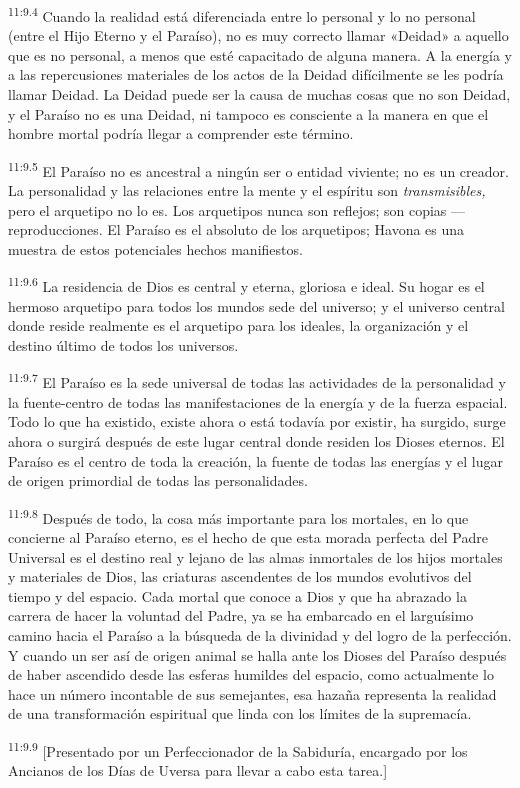 \par
\textsuperscript{11:9.4} Cuando la realidad está diferenciada entre lo personal y lo no personal (entre el Hijo Eterno y el Paraíso), no es muy correcto llamar «Deidad» a aquello que es no personal, a menos que esté capacitado de alguna manera. A la energía y a las repercusiones materiales de los actos de la Deidad difícilmente se les podría llamar Deidad. La Deidad puede ser la causa de muchas cosas que no son Deidad, y el Paraíso no es una Deidad, ni tampoco es consciente a la manera en que el hombre mortal podría llegar a comprender este término.

\par
\textsuperscript{11:9.5} El Paraíso no es ancestral a ningún ser o entidad viviente; no es un creador. La personalidad y las relaciones entre la mente y el espíritu son \textit{transmisibles,} pero el arquetipo no lo es. Los arquetipos nunca son reflejos; son copias ---reproducciones. El Paraíso es el absoluto de los arquetipos; Havona es una muestra de estos potenciales hechos manifiestos.

\par
\textsuperscript{11:9.6} La residencia de Dios es central y eterna, gloriosa e ideal. Su hogar es el hermoso arquetipo para todos los mundos sede del universo; y el universo central donde reside realmente es el arquetipo para los ideales, la organización y el destino último de todos los universos.

\par
\textsuperscript{11:9.7} El Paraíso es la sede universal de todas las actividades de la personalidad y la fuente-centro de todas las manifestaciones de la energía y de la fuerza espacial. Todo lo que ha existido, existe ahora o está todavía por existir, ha surgido, surge ahora o surgirá después de este lugar central donde residen los Dioses eternos. El Paraíso es el centro de toda la creación, la fuente de todas las energías y el lugar de origen primordial de todas las personalidades.

\par
\textsuperscript{11:9.8} Después de todo, la cosa más importante para los mortales, en lo que concierne al Paraíso eterno, es el hecho de que esta morada perfecta del Padre Universal es el destino real y lejano de las almas inmortales de los hijos mortales y materiales de Dios, las criaturas ascendentes de los mundos evolutivos del tiempo y del espacio. Cada mortal que conoce a Dios y que ha abrazado la carrera de hacer la voluntad del Padre, ya se ha embarcado en el larguísimo camino hacia el Paraíso a la búsqueda de la divinidad y del logro de la perfección. Y cuando un ser así de origen animal se halla ante los Dioses del Paraíso después de haber ascendido desde las esferas humildes del espacio, como actualmente lo hace un número incontable de sus semejantes, esa hazaña representa la realidad de una transformación espiritual que linda con los límites de la supremacía.

\par
\textsuperscript{11:9.9} [Presentado por un Perfeccionador de la Sabiduría, encargado por los Ancianos de los Días de Uversa para llevar a cabo esta tarea.]